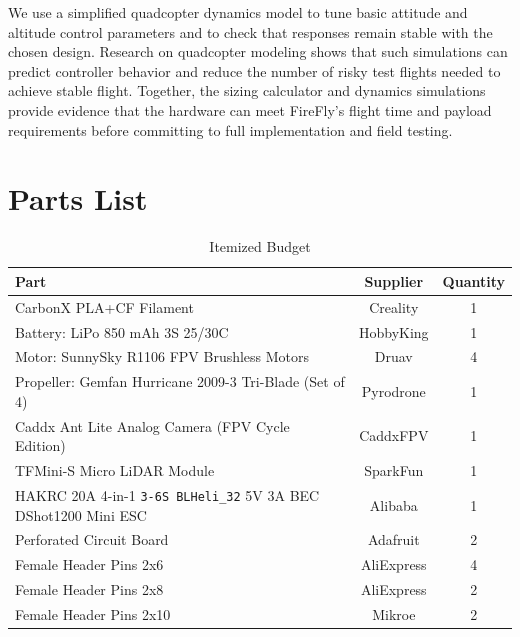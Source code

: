 \documentclass[journal, onecolumn]{IEEEtran}
\begin{document}
We use a simplified quadcopter dynamics model to tune basic attitude and altitude control parameters and to check that responses remain stable with the chosen design. Research on quadcopter modeling shows that such simulations can predict controller behavior and reduce the number of risky test flights needed to achieve stable flight. Together, the sizing calculator and dynamics simulations provide evidence that the hardware can meet FireFly’s flight time and payload requirements before committing to full implementation and field testing. 

\vspace{0.5in}






\newpage

\section{Parts List}


\begin{table}[H]
    \centering
    \small
    \begin{tabular}{|l|c|c|}
        \hline
        \textbf{Part} & \textbf{Supplier} & \textbf{Quantity} \\
        \hline
        CarbonX PLA+CF Filament & Creality & 1 \\
        \hline
        Battery: LiPo 850 mAh 3S 25/30C & HobbyKing & 1 \\
        \hline
        Motor: SunnySky R1106 FPV Brushless Motors & Druav & 4 \\
        \hline
        Propeller: Gemfan Hurricane 2009-3 Tri-Blade (Set of 4) & Pyrodrone & 1 \\
        \hline
        Caddx Ant Lite Analog Camera (FPV Cycle Edition) & CaddxFPV & 1 \\
        \hline
        TFMini-S Micro LiDAR Module & SparkFun & 1 \\
        \hline
        HAKRC 20A 4-in-1 \verb|3-6S BLHeli_32| 5V 3A BEC DShot1200 Mini ESC & Alibaba & 1 \\
        \hline
        Perforated Circuit Board & Adafruit & 2 \\
        \hline
        Female Header Pins 2x6 & AliExpress & 4 \\
        \hline
        Female Header Pins 2x8 & AliExpress & 2 \\
        \hline
        Female Header Pins 2x10 & Mikroe & 2 \\
        \hline
    \end{tabular}
    \caption{Itemized Budget}
    \label{tab:budget}
\end{table}
\end{document}
